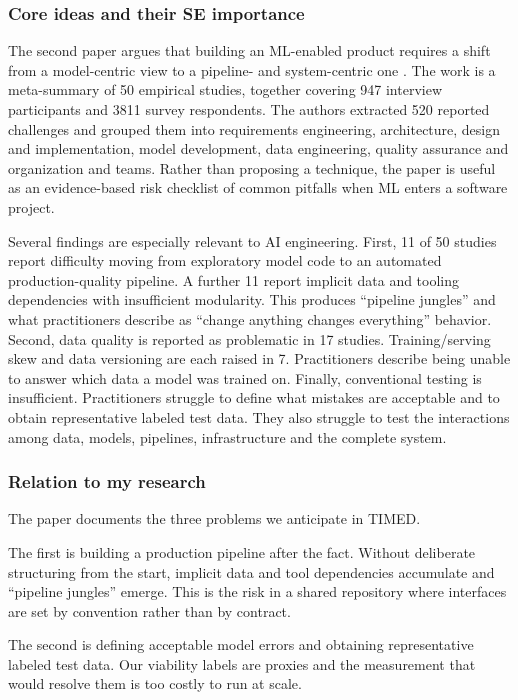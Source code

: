 \documentclass{article}
\begin{document}
\subsubsection*{Core ideas and their SE importance}

The second paper argues that building an ML-enabled product requires a shift from a model-centric view to a pipeline- and system-centric one \cite{nahar2023metasummary}. The work is a meta-summary of 50 empirical studies, together covering 947 interview participants and 3811 survey respondents. The authors extracted 520 reported challenges and grouped them into requirements engineering, architecture, design and implementation, model development, data engineering, quality assurance and organization and teams. Rather than proposing a technique, the paper is useful as an evidence-based risk checklist of common pitfalls when ML enters a software project.

Several findings are especially relevant to AI engineering. First, 11 of 50 studies report difficulty moving from exploratory model code to an automated production-quality pipeline. A further 11 report implicit data and tooling dependencies with insufficient modularity. This produces ``pipeline jungles'' and what practitioners describe as ``change anything changes everything'' behavior. Second, data quality is reported as problematic in 17 studies. Training/serving skew and data versioning are each raised in 7. Practitioners describe being unable to answer which data a model was trained on. Finally, conventional testing is insufficient. Practitioners struggle to define what mistakes are acceptable and to obtain representative labeled test data. They also struggle to test the interactions among data, models, pipelines, infrastructure and the complete system.

\subsubsection*{Relation to my research}

The paper documents the three problems we anticipate in TIMED.

The first is building a production pipeline after the fact. Without deliberate structuring from the start, implicit data and tool dependencies accumulate and ``pipeline jungles'' emerge. This is the risk in a shared repository where interfaces are set by convention rather than by contract.

The second is defining acceptable model errors and obtaining representative labeled test data. Our viability labels are proxies and the measurement that would resolve them is too costly to run at scale.
\end{document}
